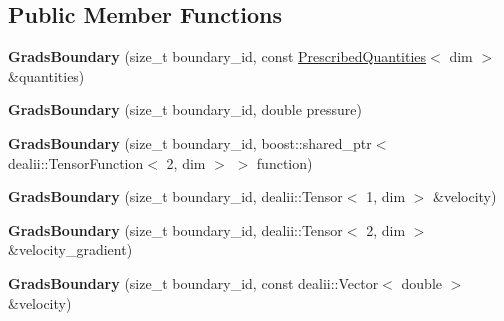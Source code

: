\subsection*{Public Member Functions}
\begin{DoxyCompactItemize}
\item 
\hypertarget{classnatrium_1_1GradsBoundary_af8cc824dbea1df5a2906fbf2cf310970}{
{\bfseries GradsBoundary} (size\_\-t boundary\_\-id, const \hyperlink{classnatrium_1_1PrescribedQuantities}{PrescribedQuantities}$<$ dim $>$ \&quantities)}
\label{classnatrium_1_1GradsBoundary_af8cc824dbea1df5a2906fbf2cf310970}

\item 
\hypertarget{classnatrium_1_1GradsBoundary_ac6299634c876127d49de84200b506d9a}{
{\bfseries GradsBoundary} (size\_\-t boundary\_\-id, double pressure)}
\label{classnatrium_1_1GradsBoundary_ac6299634c876127d49de84200b506d9a}

\item 
\hypertarget{classnatrium_1_1GradsBoundary_a6bf86434cca76d98b245173f580c63d1}{
{\bfseries GradsBoundary} (size\_\-t boundary\_\-id, boost::shared\_\-ptr$<$ dealii::TensorFunction$<$ 2, dim $>$ $>$ function)}
\label{classnatrium_1_1GradsBoundary_a6bf86434cca76d98b245173f580c63d1}

\item 
\hypertarget{classnatrium_1_1GradsBoundary_ad33d8e3fdc2e4af27f8530c252a73e05}{
{\bfseries GradsBoundary} (size\_\-t boundary\_\-id, dealii::Tensor$<$ 1, dim $>$ \&velocity)}
\label{classnatrium_1_1GradsBoundary_ad33d8e3fdc2e4af27f8530c252a73e05}

\item 
\hypertarget{classnatrium_1_1GradsBoundary_ae1cf955f1d2264e59d203c78951df273}{
{\bfseries GradsBoundary} (size\_\-t boundary\_\-id, dealii::Tensor$<$ 2, dim $>$ \&velocity\_\-gradient)}
\label{classnatrium_1_1GradsBoundary_ae1cf955f1d2264e59d203c78951df273}

\item 
\hypertarget{classnatrium_1_1GradsBoundary_a907418b07a4ab871d50439798efc0d35}{
{\bfseries GradsBoundary} (size\_\-t boundary\_\-id, const dealii::Vector$<$ double $>$ \&velocity)}
\label{classnatrium_1_1GradsBoundary_a907418b07a4ab871d50439798efc0d35}


\end{DoxyCompactItemize}
